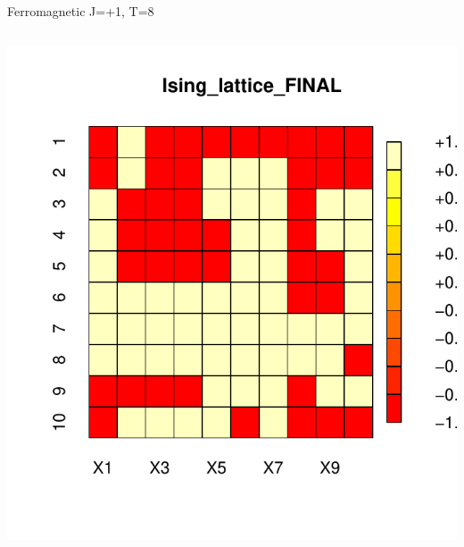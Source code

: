 \documentclass{beamer}
\begin{document}
\begin{frame}{Ferromagnetic J=+1, T=8}
\begin{columns}
\begin{column}{0.5\textwidth}
\begin{center}
     \includegraphics[width=\textwidth]{Pic/J+1_10_6000_T=8_FINAL.pdf}
     \end{center}
\end{column}
\end{columns}
\end{frame}
\end{document}
